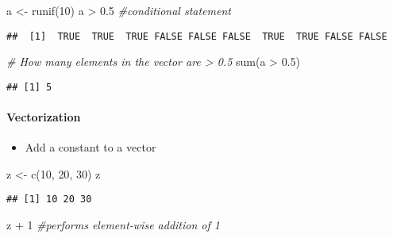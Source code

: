 \documentclass[
]{article}
\newenvironment{Shaded}{\begin{snugshade}}{\end{snugshade}}
\newcommand{\CommentTok}[1]{\textcolor[rgb]{0.56,0.35,0.01}{\textit{#1}}}
\newcommand{\DecValTok}[1]{\textcolor[rgb]{0.00,0.00,0.81}{#1}}
\newcommand{\FloatTok}[1]{\textcolor[rgb]{0.00,0.00,0.81}{#1}}
\newcommand{\FunctionTok}[1]{\textcolor[rgb]{0.00,0.00,0.00}{#1}}
\newcommand{\NormalTok}[1]{#1}
\newcommand{\OtherTok}[1]{\textcolor[rgb]{0.56,0.35,0.01}{#1}}
\newcommand{\SpecialCharTok}[1]{\textcolor[rgb]{0.00,0.00,0.00}{#1}}
\providecommand{\tightlist}{%
  \setlength{\itemsep}{0pt}\setlength{\parskip}{0pt}}
\begin{document}
\begin{Shaded}
\begin{Highlighting}[]
\NormalTok{a }\OtherTok{\textless{}{-}} \FunctionTok{runif}\NormalTok{(}\DecValTok{10}\NormalTok{)}
\NormalTok{a }\SpecialCharTok{\textgreater{}} \FloatTok{0.5} \CommentTok{\#conditional statement}
\end{Highlighting}
\end{Shaded}

\begin{verbatim}
##  [1]  TRUE  TRUE  TRUE FALSE FALSE FALSE  TRUE  TRUE FALSE FALSE
\end{verbatim}

\begin{Shaded}
\begin{Highlighting}[]
\CommentTok{\# How many elements in the vector are \textgreater{} 0.5}
\FunctionTok{sum}\NormalTok{(a }\SpecialCharTok{\textgreater{}} \FloatTok{0.5}\NormalTok{)}
\end{Highlighting}
\end{Shaded}

\begin{verbatim}
## [1] 5
\end{verbatim}

\hypertarget{vectorization}{%
\paragraph{Vectorization}\label{vectorization}}

\begin{itemize}
\tightlist
\item
  Add a constant to a vector
\end{itemize}

\begin{Shaded}
\begin{Highlighting}[]
\NormalTok{z }\OtherTok{\textless{}{-}} \FunctionTok{c}\NormalTok{(}\DecValTok{10}\NormalTok{, }\DecValTok{20}\NormalTok{, }\DecValTok{30}\NormalTok{)}
\NormalTok{z}
\end{Highlighting}
\end{Shaded}

\begin{verbatim}
## [1] 10 20 30
\end{verbatim}

\begin{Shaded}
\begin{Highlighting}[]
\NormalTok{z }\SpecialCharTok{+} \DecValTok{1} \CommentTok{\#performs element{-}wise addition of 1}
\end{Highlighting}
\end{Shaded}
\end{document}
